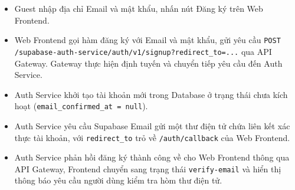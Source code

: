 \begin{itemize}
\item Guest nhập địa chỉ Email và mật khẩu, nhấn nút Đăng ký trên Web Frontend.
\item Web Frontend gọi hàm đăng ký với Email và mật khẩu, gửi yêu cầu \texttt{POST /supabase-auth-service/auth/v1/signup?redirect\_to=...} qua API Gateway. Gateway thực hiện định tuyến và chuyển tiếp yêu cầu đến Auth Service.
\item Auth Service khởi tạo tài khoản mới trong Database ở trạng thái chưa kích hoạt (\texttt{email\_confirmed\_at = null}).
\item Auth Service yêu cầu Supabase Email gửi một thư điện tử chứa liên kết xác thực tài khoản, với \texttt{redirect\_to} trỏ về \texttt{/auth/callback} của Web Frontend.
\item Auth Service phản hồi đăng ký thành công về cho Web Frontend thông qua API Gateway, Frontend chuyển sang trạng thái \texttt{verify-email} và hiển thị thông báo yêu cầu người dùng kiểm tra hòm thư điện tử.
\end{itemize}
